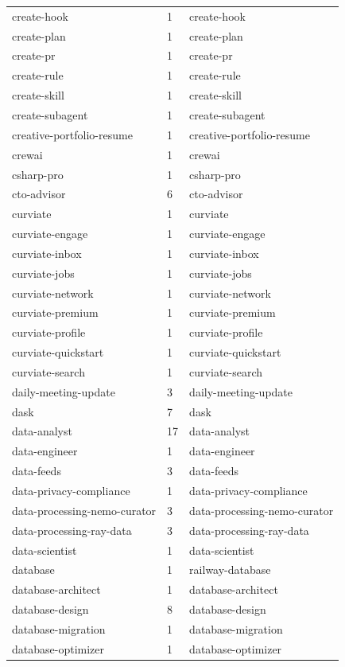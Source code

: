 \begin{longtable}{@{}lll@{}}
create-hook & 1 & create-hook\\
create-plan & 1 & create-plan\\
create-pr & 1 & create-pr\\
create-rule & 1 & create-rule\\
create-skill & 1 & create-skill\\
create-subagent & 1 & create-subagent\\
creative-portfolio-resume & 1 & creative-portfolio-resume\\
crewai & 1 & crewai\\
csharp-pro & 1 & csharp-pro\\
cto-advisor & 6 & cto-advisor\\
curviate & 1 & curviate\\
curviate-engage & 1 & curviate-engage\\
curviate-inbox & 1 & curviate-inbox\\
curviate-jobs & 1 & curviate-jobs\\
curviate-network & 1 & curviate-network\\
curviate-premium & 1 & curviate-premium\\
curviate-profile & 1 & curviate-profile\\
curviate-quickstart & 1 & curviate-quickstart\\
curviate-search & 1 & curviate-search\\
daily-meeting-update & 3 & daily-meeting-update\\
dask & 7 & dask\\
data-analyst & 17 & data-analyst\\
data-engineer & 1 & data-engineer\\
data-feeds & 3 & data-feeds\\
data-privacy-compliance & 1 & data-privacy-compliance\\
data-processing-nemo-curator & 3 & data-processing-nemo-curator\\
data-processing-ray-data & 3 & data-processing-ray-data\\
data-scientist & 1 & data-scientist\\
database & 1 & railway-database\\
database-architect & 1 & database-architect\\
database-design & 8 & database-design\\
database-migration & 1 & database-migration\\
database-optimizer & 1 & database-optimizer\\

\end{longtable}
